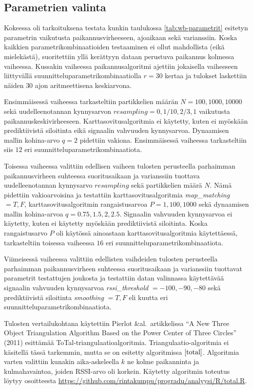 \documentclass[
  12pt,
  a4paper, twoside]{book}
\begin{document}
\subsection{Parametrien valinta} \label{parametrien-valinta}

Kokeessa oli tarkoituksena testata kunkin taulukossa \ref{tab:wb-parametrit} esitetyn parametrin vaikutusta paikannusvirheeseen, ajoaikaan sekä varianssiin. Koska kaikkien parametrikombinaatioiden testaaminen ei ollut mahdollista (eikä mielekästä), suoritettiin yllä kerättyyn dataan perustuva paikannus kolmessa vaiheessa. Kussakin vaiheessa paikannusalgoritmi ajettiin jokaisella vaiheeseen liittyvällä suunnitteluparametrikombinaatiolla \(r=30\) kertaa ja tulokset laskettiin näiden \(30\) ajon aritmeettisena keskiarvona.

Ensimmäisessä vaiheessa tarkasteltiin partikkelien määrän \(N={100,1000,10000}\) sekä uudelleenotannan kynnysarvon \(resampling={0,1/10,2/3,1}\) vaikutusta paikannuskeskivirheeseen. Karttasovitusalgoritmia ei käytetty, kuten ei myöskään prediktiivistä siloitinta eikä signaalin vahvuuden kynnysarvoa. Dynaamisen mallin kohina-arvo \(q=2\) pidettiin vakiona. Ensimmäisessä vaiheessa tarkasteltiin siis \(12\) eri suunnitteluparametrikombinaatiota.

Toisessa vaiheessa valittiin edellisen vaiheen tulosten perusteella parhaimman paikannusvirheen suhteessa suoritusaikaan ja varianssiin tuottava uudelleenotannan kynnysarvo \(resampling\) sekä partikkelien määrä \(N\). Nämä pidettiin vakioarvoisina ja testattiin karttasovitusalgoritmia \emph{map\_matching} \(={T,F}\), karttasovitusalgoritmin rangaistusarvoa \(P={1,100,1000}\) sekä dynaamisen mallin kohina-arvoa \(q={0.75,1.5,2,2.5}\). Signaalin vahvuuden kynnysarvoa ei käytetty, kuten ei käytetty myöskään prediktiivistä siloitinta. Koska rangaistusarvo \(P\) oli käytössä ainoastaan karttasovitusalgoritmia käytettäessä, tarkasteltiin toisessa vaiheessa \(16\) eri suunnitteluparametrikombinaatiota.

Viimeisessä vaiheessa valittiin edellisten vaihdeiden tulosten perusteella parhaimman paikannusvirheen suhteessa suoritusaikaan ja varianssiin tuottavat parametrit testattujen joukosta ja testattiin datan valinnassa käytettävää signaalin vahvuuden kynnysarvoa \emph{rssi\_threshold} \(={-100,-90,-80}\) sekä prediktiivistä siloitinta \emph{smoothing} \(={T,F}\) eli kuutta eri suunnitteluparametrikombinaatiota.

Tulosten vertailukohtana käytettiin Pierlot \&al.~artikkelissa ``A New Three Object Triangulation Algorithm Based on the Power Center of Three Circles'' (2011) esittämää ToTal-triangulaatioalgoritmia. \citep{Pierlot-2011} Triangulaatio-algoritmia ei käsitellä tässä tarkemmin, mutta se on esitetty algoritmissa \(\ref{total}\). Algoritmia varten valittiin kunakin aika-askeleella \(k\) ne kolme paikanninta ja kulmahavaintoa, joiden RSSI-arvo oli korkein. Käytetty algoritmin toteutus löytyy osoitteesta \newline  \url{https://github.com/rintakumpu/progradu/analyysi/R/total.R}.
\end{document}
